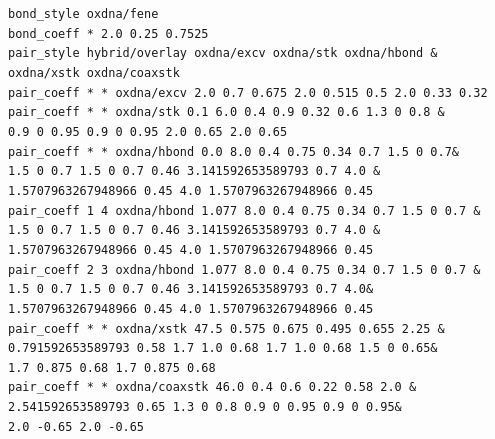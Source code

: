 \documentclass[12pt,onecolumn]{article}
\begin{document}
\smallskip
\texttt{bond\_style oxdna/fene\\
bond\_coeff * 2.0 0.25 0.7525\\
pair\_style hybrid/overlay oxdna/excv oxdna/stk oxdna/hbond \&\\
\hspace*{0.75cm}oxdna/xstk oxdna/coaxstk\\
pair\_coeff * * oxdna/excv   2.0 0.7 0.675 2.0 0.515 0.5 2.0 0.33 0.32\\
pair\_coeff * * oxdna/stk    0.1 6.0 0.4 0.9 0.32 0.6 1.3 0 0.8 \&\\
\hspace*{0.75cm}0.9 0 0.95 0.9 0 0.95 2.0 0.65 2.0 0.65\\
pair\_coeff * * oxdna/hbond  0.0 8.0 0.4 0.75 0.34 0.7 1.5 0 0.7\&\\
\hspace*{0.75cm}1.5 0 0.7 1.5 0 0.7 0.46 3.141592653589793 0.7 4.0 \&\\
\hspace*{0.75cm}1.5707963267948966 0.45 4.0 1.5707963267948966 0.45\\
pair\_coeff 1 4 oxdna/hbond  1.077 8.0 0.4 0.75 0.34 0.7 1.5 0 0.7 \&\\
\hspace*{0.75cm}1.5 0 0.7 1.5 0 0.7 0.46 3.141592653589793 0.7 4.0 \&\\
\hspace*{0.75cm}1.5707963267948966 0.45 4.0 1.5707963267948966 0.45\\
pair\_coeff 2 3 oxdna/hbond  1.077 8.0 0.4 0.75 0.34 0.7 1.5 0 0.7 \&\\
\hspace*{0.75cm}1.5 0 0.7 1.5 0 0.7 0.46 3.141592653589793 0.7 4.0\&\\
\hspace*{0.75cm}1.5707963267948966 0.45 4.0 1.5707963267948966 0.45\\
pair\_coeff * * oxdna/xstk   47.5 0.575 0.675 0.495 0.655 2.25 \&\\
\hspace*{0.75cm}0.791592653589793 0.58 1.7 1.0 0.68 1.7 1.0 0.68 1.5 0 0.65\&\\
\hspace*{0.75cm}1.7 0.875 0.68 1.7 0.875 0.68\\
pair\_coeff * * oxdna/coaxstk 46.0 0.4 0.6 0.22 0.58 2.0 \&\\
\hspace*{0.75cm}2.541592653589793 0.65 1.3 0 0.8 0.9 0 0.95 0.9 0 0.95\&\\
\hspace*{0.75cm}2.0 -0.65 2.0 -0.65\\
}
\smallskip
\end{document}
